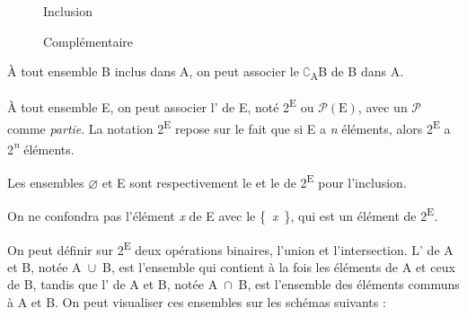 {    \begin{figure}[H]
    \begin{floatrow}
    \captionsetup{margin=.05\linewidth}
      {\caption{Inclusion}}
      {\caption{Complémentaire}}
    \end{floatrow}
    \end{figure}
                      
    À tout ensemble B inclus dans A, on peut associer le  \textrm{${\complement}$}\textsubscript{A}B de B dans A.

    À tout ensemble E, on peut associer l’ de E, noté 2\textsuperscript{E} ou $\mathcal{P}(\text{E})$, avec un $\mathcal{P}$ comme \textit{partie}. La notation 2\textsuperscript{E} repose sur le fait que si E a \textit{n} éléments, alors 2\textsuperscript{E} a 2\textit{\textsuperscript{n}} éléments.

    Les ensembles \textrm{${\varnothing}$} et E sont respectivement le  et le  de 2\textsuperscript{E} pour l’inclusion.

    On ne confondra pas l’élément \textit{x} de E avec le  \{~\textit{x}~\}, qui est un élément de 2\textsuperscript{E}.

    On peut définir sur 2\textsuperscript{E} deux opérations binaires, l’union et l’intersection. L’ de A et B, notée A~\textrm{${\cup}$}~B, est l’ensemble qui contient à la fois les éléments de A et ceux de B, tandis que l’ de A et B, notée A~\textrm{${\cap}$}~B, est l’ensemble des éléments communs à A et B. On peut visualiser ces ensembles sur les schémas suivants :

}
